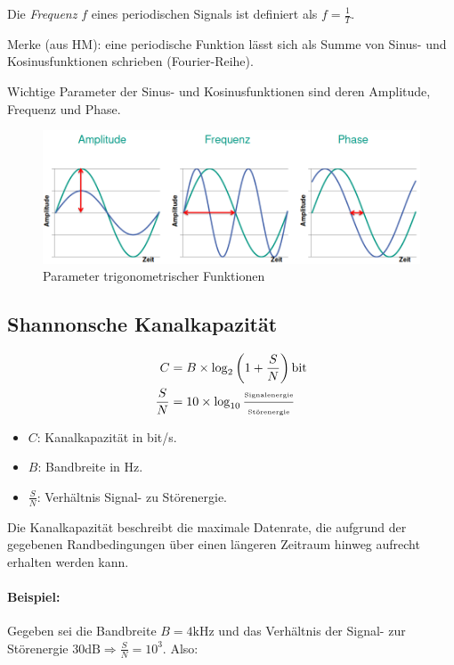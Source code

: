 \documentclass[a4paper, 14pt]{article}
\begin{document}
	Die \emph{Frequenz} $f$ eines periodischen Signals ist definiert als $f = \frac{1}{T}$.

	Merke (aus HM): eine periodische Funktion lässt sich als Summe von Sinus- und Kosinusfunktionen schrieben (Fourier-Reihe).

	Wichtige Parameter der Sinus- und Kosinusfunktionen sind deren Amplitude, Frequenz und Phase.

	\begin{figure}
		\includegraphics[width=\textwidth]{images/03-trig.png}
		\caption{Parameter trigonometrischer Funktionen}
	\end{figure}

	\subsection{Shannonsche Kanalkapazität}

	\begin{align*}
		C &= B \times \log_2\left(1 + \frac{S}{N}\right)\text{bit} \\
		\frac{S}{N} &= 10 \times \log_{10}\frac{\text{\tiny Signalenergie}}{\text{\tiny Störenergie}}
	\end{align*}

	\begin{itemize}
		\item $C$: Kanalkapazität in bit/s.
		\item $B$: Bandbreite in Hz.
		\item $\frac{S}{N}$: Verhältnis Signal- zu Störenergie.
	\end{itemize}

	Die Kanalkapazität beschreibt die maximale Datenrate, die aufgrund der gegebenen Randbedingungen über einen längeren Zeitraum hinweg aufrecht erhalten werden kann.

	\paragraph{Beispiel:}

	Gegeben sei die Bandbreite $B = 4\text{kHz}$ und das Verhältnis der Signal- zur Störenergie $30\text{dB} \Rightarrow \frac{S}{N} = 10^3$. Also:
\end{document}
